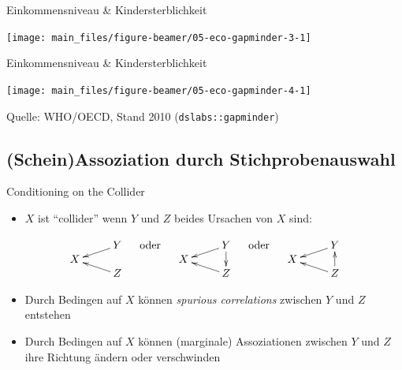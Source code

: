 \documentclass[
  10pt,
  ignorenonframetext,
]{beamer}
\providecommand{\tightlist}{%
  \setlength{\itemsep}{0pt}\setlength{\parskip}{0pt}}
\begin{document}
\begin{frame}{Einkommensniveau \& Kindersterblichkeit}
\label{einkommensniveau-kindersterblichkeit-2}
\scriptsize

\begin{center}\texttt{[image: main\_files/figure-beamer/05-eco-gapminder-3-1]} \end{center}

\normalsize
\end{frame}

\begin{frame}{Einkommensniveau \& Kindersterblichkeit}
\label{einkommensniveau-kindersterblichkeit-3}
\scriptsize

\begin{center}\texttt{[image: main\_files/figure-beamer/05-eco-gapminder-4-1]} \end{center}

\normalsize

\begin{scriptsize}
Quelle: WHO/OECD, Stand 2010 (\texttt{dslabs::gapminder})
\end{scriptsize}
\end{frame}

\subsection{(Schein)Assoziation durch
Stichprobenauswahl}\label{scheinassoziation-durch-stichprobenauswahl}

\begin{frame}{Conditioning on the Collider}
\label{conditioning-on-the-collider}
\begin{itemize}
\tightlist
\item
  \(X\) ist ``collider'' wenn \(Y\) und \(Z\) beides Ursachen von \(X\)
  sind:
\end{itemize}

\[\xymatrix@R-2pc{
& \ar[dl]  Y\\
X  &\\
& \ar[ul] Z} \quad\text{   oder   }\quad 
\xymatrix@R-2pc{
& \ar[dl] \ar[dd] Y\\
X  &\\
& \ar[ul] Z} 
\quad\text{   oder   }\quad 
\xymatrix@R-2pc{
& \ar[dl]  Y\\
X  &\\
& \ar[ul]\ar[uu] Z}\]

\begin{itemize}
\tightlist
\item
  Durch Bedingen auf \(X\) können \emph{spurious correlations} zwischen
  \(Y\) und \(Z\) entstehen
\item
  Durch Bedingen auf \(X\) können (marginale) Assoziationen zwischen
  \(Y\) und \(Z\) ihre Richtung ändern oder verschwinden
\end{itemize}
\end{frame}
\end{document}
